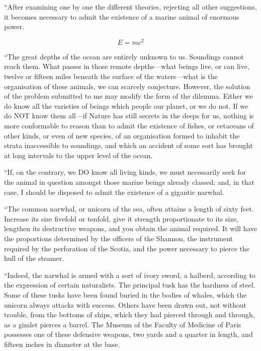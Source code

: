 ``After examining one by one the different theories, rejecting all
other suggestions, it becomes necessary to admit the existence
of a marine animal of enormous power.

\begin{equation}
E=mc^2
\end{equation}

``The great depths of the ocean are entirely unknown to us.
Soundings cannot reach them.  What passes in those remote depths---what 
beings live, or can live, twelve or fifteen miles beneath
the surface of the waters---what is the organisation of these animals,
we can scarcely conjecture.  However, the solution of the problem
submitted to me may modify the form of the dilemma.  Either we do know
all the varieties of beings which people our planet, or we do not.
If we do NOT know them all---if Nature has still secrets in the deeps
for us, nothing is more conformable to reason than to admit the existence
of fishes, or cetaceans of other kinds, or even of new species,
of an organisation formed to inhabit the strata inaccessible to soundings,
and which an accident of some sort has brought at long intervals
to the upper level of the ocean.

``If, on the contrary, we DO know all living kinds, we must
necessarily seek for the animal in question amongst those marine
beings already classed; and, in that case, I should be disposed
to admit the existence of a gigantic narwhal.

``The common narwhal, or unicorn of the sea, often attains
a length of sixty feet.  Increase its size fivefold or tenfold,
give it strength proportionate to its size, lengthen its
destructive weapons, and you obtain the animal required.
It will have the proportions determined by the officers
of the Shannon, the instrument required by the perforation
of the Scotia, and the power necessary to pierce the hull
of the steamer.\cite{inproceedings-full}

``Indeed, the narwhal is armed with a sort of ivory sword,
a halberd, according to the expression of certain naturalists.
The principal tusk has the hardness of steel.  Some of these tusks
have been found buried in the bodies of whales, which the unicorn
always attacks with success.  Others have been drawn out,
not without trouble, from the bottoms of ships, which they
had pierced through and through, as a gimlet pierces a barrel.
The Museum of the Faculty of Medicine of Paris possesses one
of these defensive weapons, two yards and a quarter in length,
and fifteen inches in diameter at the base.

